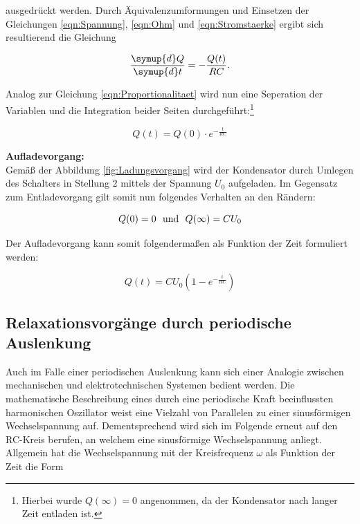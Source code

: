 \noindent ausgedrückt werden. Durch Äquivalenzumformungen und Einsetzen der Gleichungen \eqref{eqn:Spannung}, \eqref{eqn:Ohm} und \eqref{eqn:Stromstaerke} ergibt sich 
resultierend die Gleichung

\begin{equation}
    \frac{\symup{d}Q}{\symup{d}t} = -\frac{Q(t)}{RC}.
\end{equation}

\noindent Analog zur Gleichung \eqref{eqn:Proportionalitaet} wird nun eine Seperation der Variablen und die Integration beider
Seiten durchgeführt:\footnote{Hierbei wurde $Q(\infty) = 0$ angenommen, da der Kondensator nach langer Zeit
entladen ist.}

\begin{equation}
    Q(t) = Q(0) \cdot e^{-\frac{t}{RC}}
    \label{eqn:Entladung}
\end{equation}

\noindent \textbf{Aufladevorgang:}\\
Gemäß der Abbildung \ref{fig:Ladungsvorgang} wird der Kondensator durch Umlegen des Schalters in Stellung 2 mittels der Spannung
$U_0$ aufgeladen. Im Gegensatz zum Entladevorgang gilt somit nun folgendes Verhalten an den Rändern:

\begin{equation*}
    Q(0) =0 \,\,\,\,\text{und}\,\,\,\, Q(\infty)= CU_0\\
\end{equation*}

\noindent Der Aufladevorgang kann somit folgendermaßen als Funktion der Zeit formuliert werden:

\begin{equation}
    Q(t) = CU_0\left(1 - e^{-\frac{t}{RC}}\right)
\end{equation}

\subsection{Relaxationsvorgänge durch periodische Auslenkung}

Auch im Falle einer periodischen Auslenkung kann sich einer Analogie zwischen mechanischen und elektrotechnischen Systemen
bedient werden. Die mathematische Beschreibung eines durch eine periodische Kraft beeinflussten harmonischen Oszillator weist
eine Vielzahl von Parallelen zu einer sinusförmigen Wechselspannung auf. Dementsprechend wird sich im Folgende erneut auf den
RC-Kreis berufen, an welchem eine sinusförmige Wechselspannung anliegt.\\
Allgemein hat die Wechselspannung mit der Kreisfrequenz $\omega$ als Funktion der Zeit die Form

